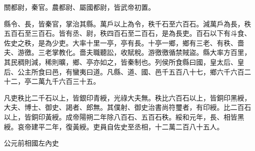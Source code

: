\begin{pinyinscope}
關都尉，秦官。農都尉、屬國都尉，皆武帝初置。

縣令、長，皆秦官，掌治其縣。萬戶以上為令，秩千石至六百石。減萬戶為長，秩五百石至三百石。皆有丞、尉，秩四百石至二百石，是為長吏。百石以下有斗食、佐史之秩，是為少吏。大率十里一亭，亭有長。十亭一鄉，鄉有三老、有秩、嗇夫、游徼。三老掌教化。嗇夫職聽訟，收賦稅。游徼徼循禁賊盜。縣大率方百里，其民稠則減，稀則曠，鄉、亭亦如之，皆秦制也。列侯所食縣曰國，皇太后、皇后、公主所食曰邑，有蠻夷曰道。凡縣、道、國、邑千五百八十七，鄉六千六百二十二，亭二萬九千六百三十五。

凡吏秩比二千石以上，皆銀印青綬，光祿大夫無。秩比六百石以上，皆銅印黑綬，大夫、博士、御史、謁者、郎無。其僕射、御史治書尚符璽者，有印綬。比二百石以上，皆銅印黃綬。成帝陽朔二年除八百石、五百石秩。綏和元年，長、相皆黑綬。哀帝建平二年，復黃綬。吏員自佐史至丞相，十二萬二百八十五人。

公元前相國左內史


\end{pinyinscope}